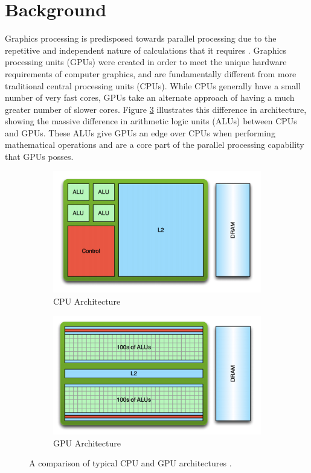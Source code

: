 \documentclass{article}
\begin{document}
\section{Background}
Graphics processing is predisposed towards parallel processing due to the repetitive and independent nature of calculations that it requires \cite[p.~4]{sellers2016}. Graphics processing units (GPUs) were created in order to meet the unique hardware requirements of computer graphics, and are fundamentally different from more traditional central processing units (CPUs). While CPUs generally have a small number of very fast cores, GPUs take an alternate approach of having a much greater number of slower cores. Figure \ref{fig:architecture} illustrates this difference in architecture, showing the massive difference in arithmetic logic units (ALUs) between CPUs and GPUs. These ALUs give GPUs an edge over CPUs when performing mathematical operations and are a core part of the parallel processing capability that GPUs posses.

\begin{figure}[h]
    \centering
    \begin{subfigure}[b]{0.39\textwidth}
    	\includegraphics[width=\textwidth]{cpu}
    	\caption{CPU Architecture}
    	\label{fig:cpu}
    \end{subfigure}
    \begin{subfigure}[b]{0.39\textwidth}
	    \includegraphics[width=\textwidth]{gpu}
	    \caption{GPU Architecture}
	    \label{fig:gpu}
    \end{subfigure}
	\caption{A comparison of typical CPU and GPU architectures \cite{larkin2016}.}
	\label{fig:architecture}
\end{figure}
\end{document}

